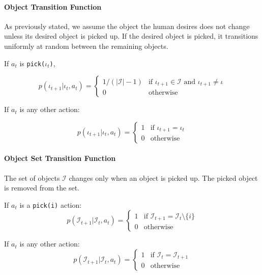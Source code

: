\documentclass[conference]{IEEEtran}
\newcommand{\Iota}{\mathcal{I}}
\begin{document}
\paragraph{Object Transition Function}
As previously stated, we assume the object the human desires does not change unless its desired object is picked up. If the desired object is picked, it transitions uniformly at random between the remaining objects. 

If $a_t$ is \texttt{pick($\iota_t$)}, 

\begin{equation*}
	p(\iota_{t+1} | \iota_t, a_t) = \begin{cases}
		1/(|\Iota|-1) & \text{if } \iota_{t+1} \in \Iota \text{ and } \iota_{t+1} \ne \iota \\
		0 & \text{otherwise} 
	\end{cases}
\end{equation*}


If $a_t$ is any other action: 

\begin{equation*}
	p(\iota_{t+1} | \iota_t, a_t) = \begin{cases} 
		1 & \text{if $\iota_{t+1} = \iota_t$} \\
		0 & \text{otherwise}
	\end{cases}
\end{equation*}

\paragraph{Object Set Transition Function}

The set of objects $\Iota$ changes only when an object is picked up. The picked object is removed from the set. 

If $a_t$ is a \texttt{pick(i)} action: 
\begin{equation*}
	p(\Iota_{t+1} | \Iota_t, a_t) = \begin{cases}
		1 & \text{if $\Iota_{t+1} = \Iota_t \setminus \{i\}$} \\ 
		0 & \text{otherwise}
	\end{cases}
\end{equation*}


If $a_t$ is any other action: 
\begin{equation*}
	p(\Iota_{t+1} | \Iota_t, a_t) = \begin{cases}
		1 & \text{if $\Iota_{t} = \Iota_{t+1}$} \\ 
		0 & \text{otherwise}
	\end{cases}
\end{equation*}
\end{document}
